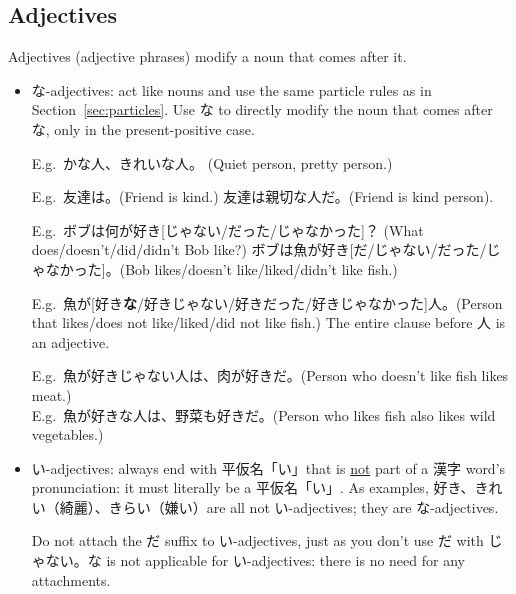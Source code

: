 \documentclass[../nihongo-gakushuu-kyouzai.tex]{subfiles}
\begin{document}
\subsection{Adjectives}
Adjectives (adjective phrases) modify a noun that comes after it.
\begin{itemize}
    \item な-adjectives: act like nouns and use the same particle rules as in Section~\ref{sec:particles}. Use な to directly modify the noun that comes after な, only in the present-positive case.


    E.g.\ かな人、きれいな人。 (Quiet person, pretty person.)

    E.g.\ 友達は。(Friend is kind.) 友達は親切な人だ。(Friend is kind person).

    E.g.\ ボブは何が好き[じゃない/だった/じゃなかった]？ (What does/doesn't/did/didn't Bob like?) ボブは魚が好き[だ/じゃない/だった/じゃなかった]。(Bob likes/doesn't like/liked/didn't like fish.)

    E.g.\ 魚が[好き\textbf{な}/好きじゃない/好きだった/好きじゃなかった]人。(Person that likes/does not like/liked/did not like fish.) The entire clause before 人 is an adjective.

    E.g.\ 魚が好きじゃない人は、肉が好きだ。(Person who doesn't like fish likes meat.)\\
    E.g.\ 魚が好きな人は、野菜も好きだ。(Person who likes fish also likes wild vegetables.)

    \item い-adjectives: always end with 平仮名「い」that is \ul{not} part of a 漢字 word's pronunciation: it must literally be a 平仮名「い」. As examples, 好き、きれい（綺麗）、きらい（嫌い）are all not い-adjectives; they are な-adjectives. 


    Do not attach the だ suffix to い-adjectives, just as you don't use だ with じゃない。な is not applicable for い-adjectives: there is no need for any attachments.


\end{itemize}
\end{document}
